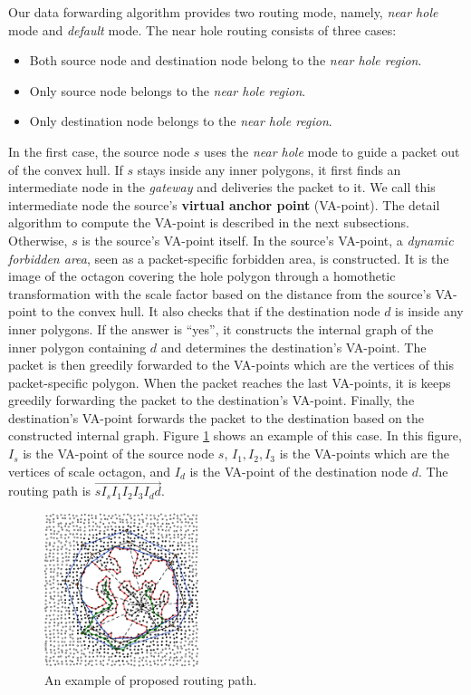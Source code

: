 Our data forwarding algorithm provides two routing mode, namely, \emph{near hole} mode and \emph{default} mode. The near hole routing consists of three cases:
\begin{itemize}
\item Both source node and destination node belong to the \emph{near hole region}.
\item Only source node belongs to the \emph{near hole region}.
\item Only destination node belongs to the \emph{near hole region}.
\end{itemize}

In the first case, the source node $s$ uses the \emph{near hole} mode to guide a packet out of the convex hull. If $s$ stays inside any inner polygons, it first finds an intermediate node in the \emph{gateway} and deliveries the packet to it. We call this intermediate node the source's \textbf{virtual anchor point} (VA-point). The detail algorithm to compute the VA-point is described in the next subsections. Otherwise, $s$ is the source's VA-point itself. In the source's VA-point, a \emph{dynamic forbidden area}, seen as a packet-specific forbidden area, is constructed. It is the image of the octagon covering the hole polygon through a homothetic transformation with the scale factor based on the distance from the source's VA-point to the convex hull. It also checks that if the destination node $d$ is inside any inner polygons. If the answer is ``yes'', it constructs the internal graph of the inner polygon containing $d$ and determines the destination's VA-point. The packet is then greedily forwarded to the VA-points which are the vertices of this packet-specific polygon. When the packet reaches the last VA-points, it is keeps greedily forwarding the packet to the destination's VA-point. Finally, the destination's VA-point forwards the packet to the destination based on the constructed internal graph. 
Figure \ref{fig-nhr-routing} shows an example of this case. In this figure, $I_s$ is the VA-point of the source node $s$, $I_1, I_2, I_3$ is the VA-points which are the vertices of scale octagon, and $I_d$ is the VA-point of the destination node $d$. The routing path is $\overrightarrow{sI_sI_1I_2I_3I_dd}$.

\begin{figure}[!htb]
\centering
\includegraphics[width=0.4\textwidth]{Chapter4/Chapter4Figs/fig-path-example.eps}
\caption{An example of proposed routing path.}
\label{fig-nhr-routing}
\end{figure}


